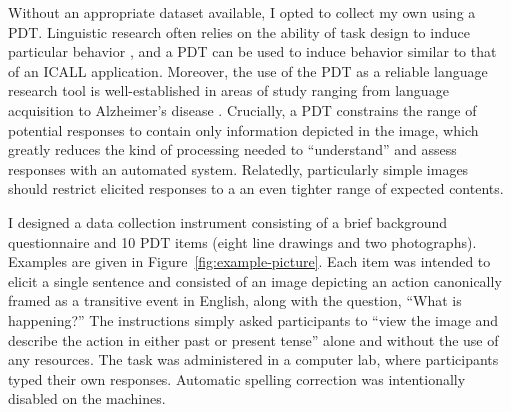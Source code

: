 Without an appropriate dataset available, I opted to collect my own using a PDT. Linguistic research often relies on the ability of task design to induce particular behavior \citep{skehan1998assessing}, and a PDT can be used to induce behavior similar to that of an ICALL application.  Moreover, the use of the PDT as a reliable language research tool is well-established in areas of study ranging from language acquisition to Alzheimer's disease \citep{ellis2000task,forbes2005detecting}. Crucially, a PDT constrains the range of potential responses to contain only information depicted in the image, which greatly reduces the kind of processing needed to ``understand'' and assess responses with an automated system. Relatedly, particularly simple images should restrict elicited responses to a an even tighter range of expected contents.

I designed a data collection instrument consisting of a brief background questionnaire and 10 PDT items (eight line drawings and two photographs). Examples are given in Figure~\ref{fig:example-picture}. Each item was intended to elicit a single sentence and consisted of an image depicting an action canonically framed as a transitive event in English, along with the question, ``What is happening?'' The instructions simply asked participants to ``view the image and describe the action in either past or present tense'' alone and without the use of any resources. The task was administered in a computer lab, where participants typed their own responses. Automatic spelling correction was intentionally disabled on the machines.


